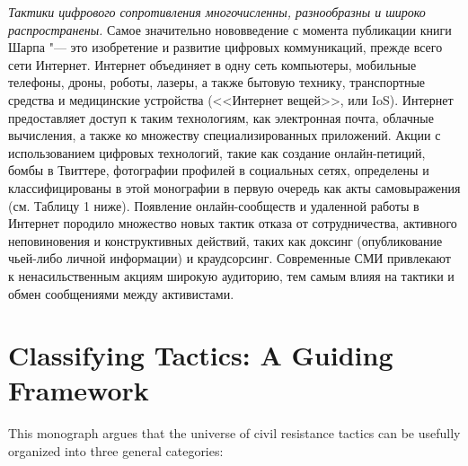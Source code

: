 \documentclass[twoside,a4paper,12pt,fleqn,openany]{extbook}
\newcommand{\ml}[2]{#2}
\begin{document}
\ml
{Digital tactics of civil resistance are numerous, diverse, and widespread.}
{\emph{Тактики цифрового сопротивления многочисленны, разнообразны и широко распространены.}}
\ml
{The most striking new development since Sharp’s book was published is the invention and growth of digital communication, primarily through the Internet.}
{Самое значительно нововведение с момента публикации книги Шарпа "--- это изобретение и развитие цифровых коммуникаций, прежде всего сети Интернет.}
\ml
{The Internet includes the worldwide web, mobile phones, email, apps, cloud computing, lasers, drones, robots, and “the Internet of things,” such as household appliances, vehicles, and medical devices.}
{Интернет объединяет в одну сеть компьютеры, мобильные телефоны, дроны, роботы, лазеры, а также бытовую технику, транспортные средства и медицинские устройства (<<Интернет вещей>>, или IoS). Интернет предоставляет доступ к таким технологиям, как электронная почта, облачные вычисления, а также ко множеству специализированных приложений.}
\ml
{Cyber actions, such as the creation of online petitions, Twitter bombs, and social media profile photos, are primarily acts of expression as defined and categorized in this monograph (see Table 1 below).}
{Акции с использованием цифровых технологий, такие как создание онлайн-петиций, бомбы в Твиттере, фотографии профилей в социальных сетях, определены и классифицированы в этой монографии  в первую очередь как акты самовыражения (см. Таблицу 1 ниже).}
\ml
{The emergence of online communities and cyber-based work has birthed many new tactics of noncooperation, active disobedience, and constructive action, such as doxing (publicizing someone’s personal information) and crowd-sourcing apps.}
{Появление онлайн-сообществ и удаленной работы в Интернет породило множество новых тактик отказа от сотрудничества, активного неповиновения и конструктивных действий, таких как доксинг (опубликование чьей-либо личной информации) и краудсорсинг.}
\ml
{Modern electronic media amplifies nonviolent actions to wide audiences, thus impacting tactics and messaging.}
{Современные СМИ привлекают к ненасильственным акциям широкую аудиторию, тем самым влияя на тактики и обмен сообщениями между активистами.}

\section*{Classifying Tactics: A Guiding Framework}

This monograph argues that the universe of civil resistance tactics can be usefully organized
into three general categories:
\end{document}
